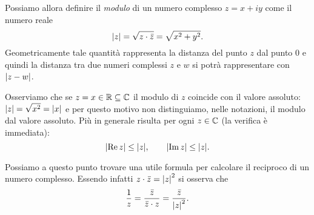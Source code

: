 Possiamo allora definire il
\emph{modulo}%
%
%
 di un numero complesso $z=x+iy$
come il numero reale
\[
{\left|z\right|} = \sqrt{z\cdot\bar z} = \sqrt{x^2+y^2}.
\]
Geometricamente tale quantità rappresenta la distanza del punto $z$
dal punto $0$ e quindi la distanza tra due numeri complessi $z$ e
$w$ si potrà rappresentare con ${\left|z-w\right|}$.

Osserviamo che se $z = x \in {\mathbb R} \subseteq {\mathbb C}$ il modulo di $z$ coincide
con il valore assoluto: ${\left|z\right|} = \sqrt{x^2} = {\left|x\right|}$ e per questo
motivo non distinguiamo, nelle notazioni, il modulo dal valore assoluto.
Più in generale risulta per ogni $z\in {\mathbb C}$ (la verifica è immediata):
\[
  {\left|\operatorname{Re} z\right|} \le {\left|z\right|}, \qquad
  {\left|\operatorname{Im}z\right|} \le {\left|z\right|}.
\]

Possiamo a questo punto trovare una utile formula per calcolare
il reciproco di un numero complesso. Essendo infatti
$z\cdot \bar z = {\left|z\right|}^2$ si osserva che
\[
  \frac{1}{z}
  = \frac{\bar z}{ \bar z \cdot z}
  = \frac{\bar z}{{\left|z\right|}^2}.
\]

